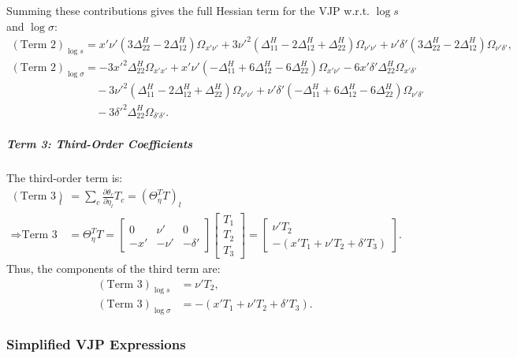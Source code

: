 \documentclass{article}
\begin{document}
Summing these contributions gives the full Hessian term for the VJP w.r.t. $\log s$ and $\log \sigma$:
%
\begin{align}
  (\text{Term 2})_{\log s}     & = x'\nu'(3\Delta^H_{22} - 2\Delta^H_{12}) \Omega_{x'\nu'} + 3\nu'^2(\Delta^H_{11}-2\Delta^H_{12}+\Delta^H_{22})\Omega_{\nu'\nu'} + \nu'\delta'(3\Delta^H_{22} - 2\Delta^H_{12})\Omega_{\nu'\delta'}, \\
  (\text{Term 2})_{\log\sigma} & = - 3x'^2\Delta^H_{22} \Omega_{x'x'} + x'\nu'(-\Delta^H_{11} + 6\Delta^H_{12} - 6\Delta^H_{22}) \Omega_{x'\nu'} - 6 x'\delta'\Delta^H_{22} \Omega_{x'\delta'} \nonumber                              \\ & \quad - 3\nu'^2(\Delta^H_{11} - 2\Delta^H_{12} + \Delta^H_{22}) \Omega_{\nu'\nu'} + \nu'\delta'(-\Delta^H_{11} + 6\Delta^H_{12} - 6\Delta^H_{22}) \Omega_{\nu'\delta'} \nonumber \\ & \quad - 3\delta'^2\Delta^H_{22} \Omega_{\delta'\delta'}.
\end{align}

\subparagraph{Term 3: Third-Order Coefficients}

The third-order term is:
%
\begin{align}
  (\text{Term 3})_l         & = \sum_c \frac{\partial\theta_c}{\partial\eta_l} T_c = (\Theta_\eta^T T)_l \\
  \Rightarrow \text{Term 3} & = \Theta_\eta^T T =
  \begin{bmatrix}
    0   & \nu'  & 0        \\
    -x' & -\nu' & -\delta'
  \end{bmatrix}
  \begin{bmatrix} T_1 \\ T_2 \\ T_3 \end{bmatrix} =
  \begin{bmatrix} \nu' T_2 \\ -(x'T_1 + \nu'T_2 + \delta'T_3) \end{bmatrix}.
\end{align}
%
Thus, the components of the third term are:
%
\begin{align}
  (\text{Term 3})_{\log s}      & = \nu' T_2,                           \\
  (\text{Term 3})_{\log \sigma} & = -(x' T_1 + \nu' T_2 + \delta' T_3).
\end{align}

\subsubsection{Simplified VJP Expressions}
\end{document}
